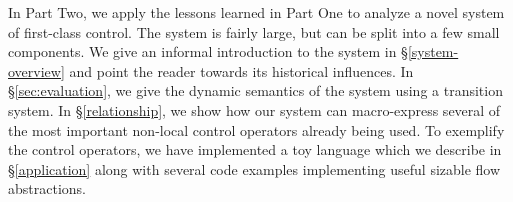 \documentclass[11pt]{article}
\begin{document}
In Part Two, we apply the lessons learned in Part One to analyze a novel system of first-class control.
The system is fairly large, but can be split into a few small components.
We give an informal introduction to the system in \S\ref{system-overview} and point the reader towards its historical influences.
In \S\ref{sec:evaluation}, we give the dynamic semantics of the system using a transition system.
In \S\ref{relationship}, we show how our system can macro-express several of the most important non-local control operators already being used.
To exemplify the control operators, we have implemented a toy language which we describe in \S\ref{application} along with several code examples implementing useful sizable flow abstractions.
\end{document}
